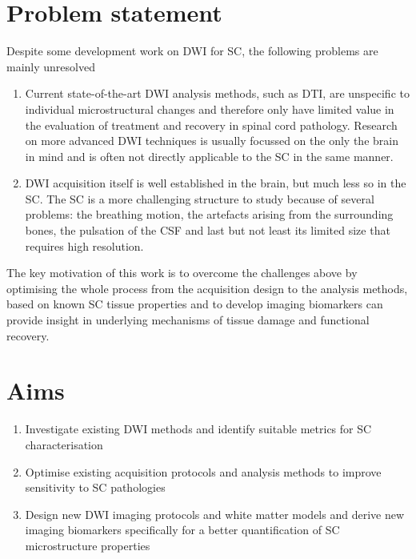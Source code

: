 

\section{Problem statement}
Despite some development work on \gls{DWI} for \gls{SC}, the following problems are mainly unresolved 
\begin{enumerate}
\item Current state-of-the-art \gls{DWI} analysis methods, such as \gls{DTI}, are unspecific to individual microstructural changes and therefore only have limited value in the evaluation of treatment and recovery in spinal cord pathology. Research on more advanced \gls{DWI} techniques is usually focussed on the only the brain in mind and is often not directly applicable to the \gls{SC} in the same manner.
\item \gls{DWI} acquisition itself is well established in the brain, but much less so in the \gls{SC}. The \gls{SC} is a more challenging structure to study because of several problems: the breathing motion, the artefacts arising from the surrounding bones, the pulsation of the {\gls{CSF}} and last but not least its limited size that requires high resolution.  
\end{enumerate} 
The key motivation of this work is to overcome the challenges above by optimising the whole process from the acquisition design to the analysis methods, based on known \gls{SC} tissue properties and to develop imaging biomarkers can provide insight in underlying mechanisms of tissue damage and functional recovery.

\section{Aims}
\begin{enumerate}
  \item Investigate existing \gls{DWI} methods and identify suitable metrics for \gls{SC} characterisation
  \item Optimise existing acquisition protocols and analysis methods to improve sensitivity to \gls{SC} pathologies
  \item Design new \gls{DWI} imaging protocols and white matter models and derive new imaging biomarkers specifically for a better quantification of \gls{SC} microstructure properties
\end{enumerate}

